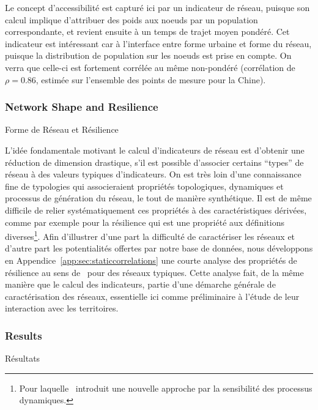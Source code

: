Le concept d'accessibilité est capturé ici par un indicateur de réseau, puisque son calcul implique d'attribuer des poids aux noeuds par un population correspondante, et revient ensuite à un temps de trajet moyen pondéré. Cet indicateur est intéressant car à l'interface entre forme urbaine et forme du réseau, puisque la distribution de population sur les noeuds est prise en compte. On verra que celle-ci est fortement corrélée au même non-pondéré (corrélation de $\rho = 0.86$, estimée sur l'ensemble des points de mesure pour la Chine).



\subsubsection{Network Shape and Resilience}{Forme de Réseau et Résilience}

L'idée fondamentale motivant le calcul d'indicateurs de réseau est d'obtenir une réduction de dimension drastique, s'il est possible d'associer certains ``types'' de réseau à des valeurs typiques d'indicateurs. On est très loin d'une connaissance fine de typologies qui associeraient propriétés topologiques, dynamiques et processus de génération du réseau, le tout de manière synthétique. Il est de même difficile de relier systématiquement ces propriétés à des caractéristiques dérivées, comme par exemple pour la résilience qui est une propriété aux définitions diverses\footnote{Pour laquelle~\cite{Gao:2016ty} introduit une nouvelle approche par la sensibilité des processus dynamiques.}. Afin d'illustrer d'une part la difficulté de caractériser les réseaux et d'autre part les potentialités offertes par notre base de données, nous développons en Appendice~\ref{app:sec:staticcorrelations} une courte analyse des propriétés de résilience au sens de~\cite{ash2007optimizing} pour des réseaux typiques. Cette analyse fait, de la même manière que le calcul des indicateurs, partie d'une démarche générale de caractérisation des réseaux, essentielle ici comme préliminaire à l'étude de leur interaction avec les territoires.



\subsubsection{Results}{Résultats}


